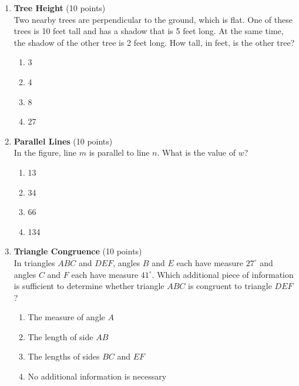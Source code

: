 \begin{enumerate}
  \newpage

  \item \textbf{Tree Height} (10 points)\\
  Two nearby trees are perpendicular to the ground, which is flat. One of these trees is 10 feet tall and has a shadow that is 5 feet long. At the same time, the shadow of the other tree is 2 feet long. How tall, in feet, is the other tree?\\
  \begin{enumerate}[label=(\Alph*)]
    \item 3
    \item 4
    \item 8
    \item 27
  \end{enumerate}
  \begin{subanswer}
  \end{subanswer}

  \item \textbf{Parallel Lines} (10 points)\\
  In the figure, line $m$ is parallel to line $n$. What is the value of $w$?\\
  \begin{enumerate}[label=(\Alph*)]
    \item 13
    \item 34
    \item 66
    \item 134
  \end{enumerate}
  \begin{subanswer}
  \end{subanswer}

  \newpage

  \item \textbf{Triangle Congruence} (10 points)\\
  In triangles $A B C$ and $D E F$, angles $B$ and $E$ each have measure $27^{\circ}$ and angles $C$ and $F$ each have measure $41^{\circ}$. Which additional piece of information is sufficient to determine whether triangle $A B C$ is congruent to triangle $D E F$?\\
  \begin{enumerate}[label=(\Alph*)]
    \item The measure of angle $A$
    \item The length of side $A B$
    \item The lengths of sides $B C$ and $E F$
    \item No additional information is necessary
  \end{enumerate}
  \begin{subanswer}
  \end{subanswer}


\end{enumerate}
